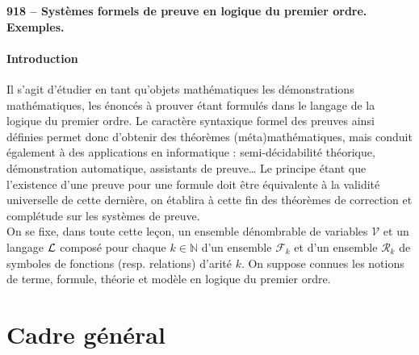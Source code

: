 \documentclass[a4paper, 11pt, twocolumn]{article}
\theoremstyle{definition}
\newtheorem{definition}[equation]{Définition}
\newcounter{n}
\newcommand\lesson[1]{{\noindent \LARGE \bfseries #1}\\[1pt]}
\def\N{\mathbb{N}}
\def\L{{\cal{L}}}
\begin{document}
\author{\textsc{Nguyễn} Lê Thành Dũng}

\lesson{918 -- Systèmes formels de preuve en logique du premier ordre. Exemples.}

\paragraph{Introduction} Il s'agit d'étudier en tant qu'objets mathématiques les
démonstrations mathématiques, les énoncés à prouver étant formulés dans le
langage de la logique du premier ordre. Le caractère syntaxique formel des
preuves ainsi définies permet donc d'obtenir des théorèmes (méta)mathématiques,
mais conduit également à des applications en informatique : semi-décidabilité
théorique, démonstration automatique, assistants de preuve… Le principe étant
que l'existence d'une preuve pour une formule doit être équivalente à la
validité universelle de cette dernière, on établira à cette fin des théorèmes de
correction et complétude sur les systèmes de preuve.\\

On se fixe, dans toute cette leçon, un ensemble dénombrable de variables
$\mathcal{V}$ et un langage $\L$ composé pour chaque $k \in \N$ d'un ensemble
$\mathcal{F}_k$ et d'un ensemble $\mathcal{R}_k$ de symboles de fonctions (resp.
relations) d'arité $k$. On suppose connues les notions de terme, formule,
théorie et modèle en logique du premier ordre.

\section{Cadre général}



\end{document}
